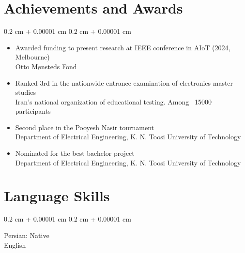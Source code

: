 \documentclass[10pt, letterpaper]{article}
\newenvironment{highlightsforbulletentries}{
    \begin{itemize}[
        topsep=0.10 cm,
        parsep=0.10 cm,
        partopsep=0pt,
        itemsep=0pt,
        leftmargin=10pt
    ]
}{
    \end{itemize}
} %
\newenvironment{onecolentry}{
    \begin{adjustwidth}{
        0.2 cm + 0.00001 cm
    }{
        0.2 cm + 0.00001 cm
    }
}{
    \end{adjustwidth}
} %
\begin{document}
    \section{Achievements and Awards}

        \begin{onecolentry}
            \begin{highlightsforbulletentries}

                \item Awarded funding to present research at IEEE conference in AIoT (2024, Melbourne)\\
                {\small Otto Mønsteds Fond}

                \item Ranked 3rd in the nationwide entrance examination of electronics master studies\\
                {\small Iran’s national organization of educational testing. Among ~15000 participants}

                \item Second place in the Pooyesh Nasir tournament\\
                {\small Department of Electrical Engineering, K. N. Toosi University of Technology}

                \item Nominated for the best bachelor project\\
                {\small Department of Electrical Engineering, K. N. Toosi University of Technology}

            \end{highlightsforbulletentries}
        \end{onecolentry}



    \section{Language Skills }

        \begin{onecolentry}
            Persian: Native\\
            English
        \end{onecolentry}

    
\end{document}
